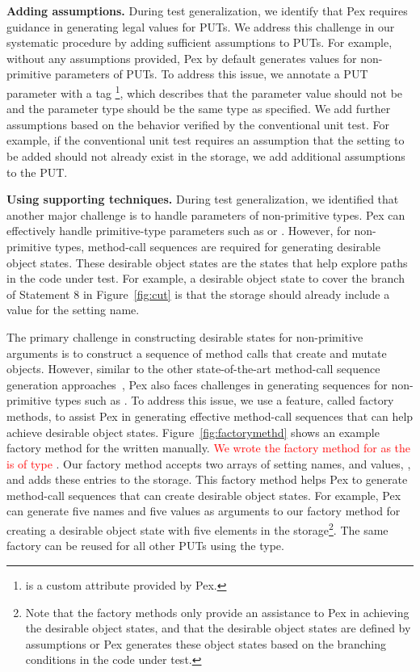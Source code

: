 \textbf{Adding assumptions.} During test generalization, we identify that Pex requires guidance in generating legal values for PUTs. We address this challenge in our systematic procedure by adding sufficient assumptions to PUTs. For example, without any assumptions provided, Pex by default generates  values for non-primitive parameters of PUTs. To address this issue, we annotate a PUT parameter with a tag \footnote{ is a custom attribute provided by Pex.}, which describes that the parameter value should not be  and the parameter type should be the same type as specified. We add further assumptions based on the behavior verified by the conventional unit test. For example, if the conventional unit test requires an assumption that the setting to be added should not already exist in the storage, we add additional assumptions to the PUT.

\textbf{Using supporting techniques.} During test generalization, we identified that another major challenge is to handle parameters of non-primitive types. Pex can effectively handle primitive-type parameters such as  or . However, for non-primitive types, method-call sequences are required for generating desirable object states. These desirable object states are the states that help explore paths in the code under test. For example, a desirable object state to cover the  branch of Statement 8 in Figure~\ref{fig:cut} is that the storage should already include a value for the setting name. 

The primary challenge in constructing desirable states for non-primitive arguments is to construct a sequence of method calls that create and mutate objects. However, similar to the other state-of-the-art method-call sequence generation approaches~\cite{}, Pex also faces challenges in generating sequences for non-primitive types such as . To address this issue, we use a feature, called factory methods, to assist Pex in generating effective method-call sequences that can help achieve desirable object states. Figure~\ref{fig:factorymethd} shows an example factory method for the  written manually. \textcolor{red}{We wrote the factory method for  as the  is of type }. Our factory method accepts two arrays of setting names,  and values, , and adds these entries to the storage. This factory method helps Pex to generate method-call sequences that can create desirable object states. For example, Pex can generate five names and five values as arguments to our factory method for creating a desirable object state with five elements in the storage\footnote{Note that the factory methods only provide an assistance to Pex in achieving the desirable object states, and that the desirable object states are defined by assumptions or Pex generates these object states based on the branching conditions in the code under test.}. The same factory can be reused for all other PUTs using the  type.

